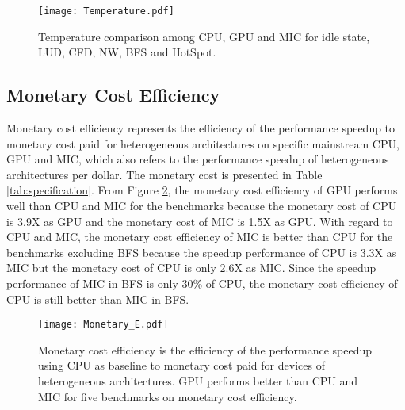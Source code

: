     \begin{figure}[h!]
  \centering
  \begin{minipage}{0.5\textwidth}
    \centering
   \centering
     \texttt{[image: Temperature.pdf]}    
\caption{Temperature comparison among CPU, GPU and MIC for idle state, LUD, CFD, NW, BFS and HotSpot.}
\label{fig:temperature}
\end{minipage}%
\end{figure}

\subsection{Monetary Cost Efficiency} 
Monetary cost efficiency represents the efficiency of the performance speedup to monetary cost paid for heterogeneous architectures on specific mainstream CPU, GPU and MIC, which also refers to the performance speedup of heterogeneous architectures per dollar. The monetary cost is presented in Table \ref{tab:specification}. From Figure \ref{fig:monetaryE}, the monetary cost efficiency of GPU performs well than CPU and MIC for the benchmarks because the monetary cost of CPU is 3.9X as GPU and the monetary cost of MIC is 1.5X as GPU. With regard to CPU and MIC, the monetary cost efficiency of MIC is better than CPU for the benchmarks excluding BFS because the speedup performance of CPU is 3.3X as MIC but the monetary cost of CPU is only 2.6X as MIC. Since the speedup performance of MIC in BFS is only 30\% of CPU, the monetary cost efficiency of CPU is still better than MIC in BFS.

    \begin{figure}[h!]
  \centering
  \begin{minipage}{0.5\textwidth}
    \centering
   \centering
     \texttt{[image: Monetary\_E.pdf]}    
\caption{Monetary cost efficiency is the efficiency of the performance speedup using CPU as baseline to monetary cost paid for devices of heterogeneous architectures. GPU performs better than CPU and MIC for five benchmarks on monetary cost efficiency.}
\label{fig:monetaryE}
\end{minipage}%
\end{figure}


